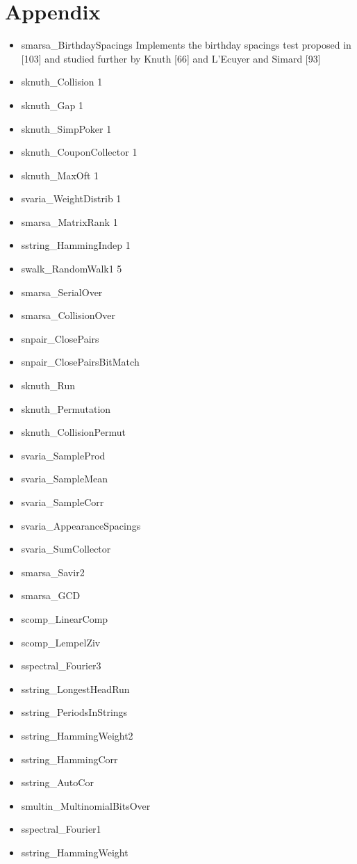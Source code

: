 \chapter{Appendix}
\label{chap:appendix1}
\begin{itemize}
\item smarsa\_BirthdaySpacings    Implements the birthday spacings test proposed in [103] and studied further by Knuth [66] and
L’Ecuyer and Simard [93]

\item sknuth\_Collision   1 
\item sknuth\_Gap   1 
\item sknuth\_SimpPoker  1 
\item sknuth\_CouponCollector   1 
\item sknuth\_MaxOft  1 
\item svaria\_WeightDistrib   1   
\item smarsa\_MatrixRank   1   
\item sstring\_HammingIndep   1  
\item swalk\_RandomWalk1   5   
\item smarsa\_SerialOver      
\item smarsa\_CollisionOver        
\item snpair\_ClosePairs      
\item snpair\_ClosePairsBitMatch                    
\item sknuth\_Run      
\item sknuth\_Permutation      
\item sknuth\_CollisionPermut        
\item svaria\_SampleProd      
\item svaria\_SampleMean     
\item svaria\_SampleCorr      
\item svaria\_AppearanceSpacings          
\item svaria\_SumCollector           
\item smarsa\_Savir2      
\item smarsa\_GCD            
\item scomp\_LinearComp      
\item scomp\_LempelZiv      
\item sspectral\_Fourier3      
\item sstring\_LongestHeadRun      
\item sstring\_PeriodsInStrings      
\item sstring\_HammingWeight2      
\item sstring\_HammingCorr              
\item sstring\_AutoCor   
\item smultin\_MultinomialBitsOver
\item sspectral\_Fourier1
\item sstring\_HammingWeight
\end{itemize}